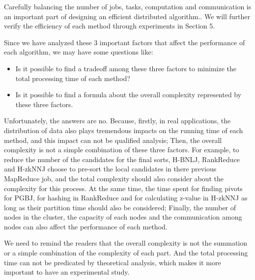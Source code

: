 Carefully balancing the number of jobs, tasks, computation and communication 
is an important part of designing an efficient distributed algorithm..
We will further verify the efficiency of each method through experiments in Section 5.

Since we have analyzed these 3 important factors that affect the performance of each algorithm, we may have some 
questions like:
\begin{itemize}
\item Is it possible to find a tradeoff among these three factors to minimize the total processing time of each method?

\item Is it possible to find a formula about the overall complexity represented by these three factors.
\end{itemize}

Unfortunately, the answers are no. Because, firstly, in real applications, the distribution of data also plays 
tremendous impacts on the running time of each method, and this impact can not be qualified analysis; Then, the overall 
complexity is not a simple combination of these three factors. For example, to reduce the number of the candidates for 
the final sorts, H-BNLJ, RankReduce and H-zkNNJ choose to pre-sort the local candidates in there previous MapReduce 
job, and the total complexity should also consider about the complexity for this process. At the same time, the time spent for finding pivots for PGBJ, for hashing in RankReduce and for 
calculating z-value in H-zkNNJ as long as their partition time should also be considered; Finally, the number of nodes 
in the cluster, the capacity of each nodes and the communication among nodes can also affect the performance of each 
method.

We need to remind the readers that the overall complexity is not the summation or a simple combination of the complexity of each part. And the total processing time can not be predicated by theoretical analysis, which makes it more important to have an experimental study.
